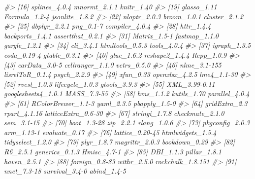 \documentclass[
]{book}
\newenvironment{Shaded}{\begin{snugshade}}{\end{snugshade}}
\newcommand{\CommentTok}[1]{\textcolor[rgb]{0.56,0.35,0.01}{\textit{#1}}}
\begin{document}
\begin{Shaded}
\begin{Highlighting}[]
\CommentTok{\#\textgreater{}  [16] splines\_4.0.4       mnormt\_2.1.1        knitr\_1.40         }
\CommentTok{\#\textgreater{}  [19] glasso\_1.11         Formula\_1.2{-}4       jsonlite\_1.8.2     }
\CommentTok{\#\textgreater{}  [22] nloptr\_2.0.3        broom\_1.0.1         cluster\_2.1.2      }
\CommentTok{\#\textgreater{}  [25] dbplyr\_2.2.1        png\_0.1{-}7           compiler\_4.0.4     }
\CommentTok{\#\textgreater{}  [28] httr\_1.4.4          backports\_1.4.1     assertthat\_0.2.1   }
\CommentTok{\#\textgreater{}  [31] Matrix\_1.5{-}1        fastmap\_1.1.0       gargle\_1.2.1       }
\CommentTok{\#\textgreater{}  [34] cli\_3.4.1           htmltools\_0.5.3     tools\_4.0.4        }
\CommentTok{\#\textgreater{}  [37] igraph\_1.3.5        coda\_0.19{-}4         gtable\_0.3.1       }
\CommentTok{\#\textgreater{}  [40] glue\_1.6.2          reshape2\_1.4.4      Rcpp\_1.0.9         }
\CommentTok{\#\textgreater{}  [43] carData\_3.0{-}5       cellranger\_1.1.0    vctrs\_0.5.0        }
\CommentTok{\#\textgreater{}  [46] nlme\_3.1{-}155        lisrelToR\_0.1.4     psych\_2.2.9        }
\CommentTok{\#\textgreater{}  [49] xfun\_0.33           openxlsx\_4.2.5      lme4\_1.1{-}30        }
\CommentTok{\#\textgreater{}  [52] rvest\_1.0.3         lifecycle\_1.0.3     gtools\_3.9.3       }
\CommentTok{\#\textgreater{}  [55] XML\_3.99{-}0.11       googlesheets4\_1.0.1 MASS\_7.3{-}55        }
\CommentTok{\#\textgreater{}  [58] hms\_1.1.2           kutils\_1.70         parallel\_4.0.4     }
\CommentTok{\#\textgreater{}  [61] RColorBrewer\_1.1{-}3  yaml\_2.3.5          pbapply\_1.5{-}0      }
\CommentTok{\#\textgreater{}  [64] gridExtra\_2.3       rpart\_4.1.16        latticeExtra\_0.6{-}30}
\CommentTok{\#\textgreater{}  [67] stringi\_1.7.8       checkmate\_2.1.0     sem\_3.1{-}15         }
\CommentTok{\#\textgreater{}  [70] boot\_1.3{-}28         zip\_2.2.1           rlang\_1.0.6        }
\CommentTok{\#\textgreater{}  [73] pkgconfig\_2.0.3     arm\_1.13{-}1          evaluate\_0.17      }
\CommentTok{\#\textgreater{}  [76] lattice\_0.20{-}45     htmlwidgets\_1.5.4   tidyselect\_1.2.0   }
\CommentTok{\#\textgreater{}  [79] plyr\_1.8.7          magrittr\_2.0.3      bookdown\_0.29      }
\CommentTok{\#\textgreater{}  [82] R6\_2.5.1            generics\_0.1.3      Hmisc\_4.7{-}1        }
\CommentTok{\#\textgreater{}  [85] DBI\_1.1.3           pillar\_1.8.1        haven\_2.5.1        }
\CommentTok{\#\textgreater{}  [88] foreign\_0.8{-}83      withr\_2.5.0         rockchalk\_1.8.151  }
\CommentTok{\#\textgreater{}  [91] nnet\_7.3{-}18         survival\_3.4{-}0      abind\_1.4{-}5        }

\end{Highlighting}
\end{Shaded}
\end{document}
